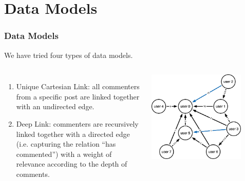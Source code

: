 \documentclass[aspectratio=169]{beamer}
\begin{document}
\section{Data Models}
\newcommand{\asuivre}{\setcounter{sauvegardeenumi}{\theenumi}}
\newcommand{\suite}{\setcounter{enumi}{\thesauvegardeenumi}}
\begin{frame}[t]
    \frametitle{Data Models}
    We have tried four types of data models.
    \begin{columns}
        \begin{enumerate}
            \item Unique Cartesian Link: all commenters from a specific post are linked together with an undirected edge.
            \item Deep Link: commenters are recursively linked together with a directed edge (i.e. capturing the relation ``has commented'') with a weight of relevance according to the depth of comments.
                \asuivre
        \end{enumerate}
        \includegraphics[width=0.8\textwidth]{figures/graph_model.png}
    \end{columns}
\end{frame}
\end{document}
